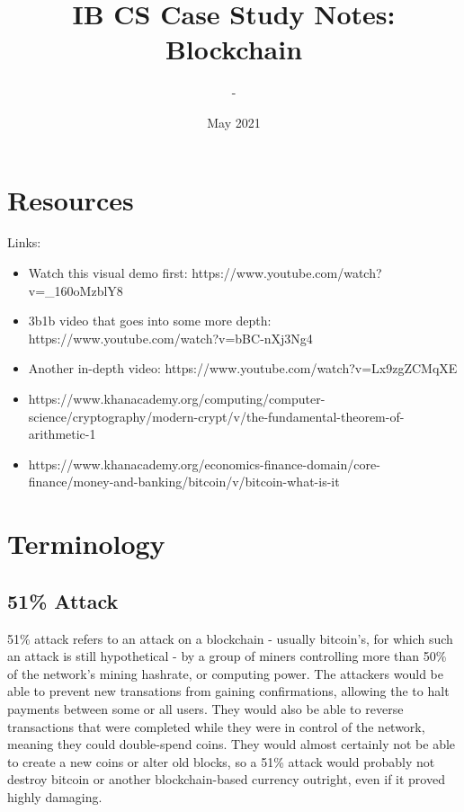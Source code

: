 \documentclass{article}
\title{\Large \textbf{IB CS Case Study Notes: Blockchain}}
\author{-}
\date{May 2021}
\begin{document}
\begin{titlepage}
    \maketitle
\end{titlepage}

\begin{center}
    \tableofcontents
\end{center}

\newpage

\section{Resources}
Links:
\begin{itemize}
    \item Watch this visual demo first: https://www.youtube.com/watch?v=\_160oMzblY8
    \item 3b1b video that goes into some more depth: https://www.youtube.com/watch?v=bBC-nXj3Ng4
    \item Another in-depth video: https://www.youtube.com/watch?v=Lx9zgZCMqXE
    \item https://www.khanacademy.org/computing/computer-science/cryptography/modern-crypt/v/the-fundamental-theorem-of-arithmetic-1
    \item https://www.khanacademy.org/economics-finance-domain/core-finance/money-and-banking/bitcoin/v/bitcoin-what-is-it
\end{itemize}

\section{Terminology}

\subsection{51\% Attack}
51\% attack refers to an attack on a blockchain - usually bitcoin's, for which
such an attack is still hypothetical - by a group of miners controlling more
than 50\% of the network's mining hashrate, or computing power. The attackers
would be able to prevent new transations from gaining confirmations, allowing
the to halt payments between some or all users. They would also be able to
reverse transactions that were completed while they were in control of the
network, meaning they could double-spend coins. They would almost certainly
not be able to create a new coins or alter old blocks, so a 51\% attack would
probably not destroy bitcoin or another blockchain-based currency outright,
even if it proved highly damaging.
\end{document}
